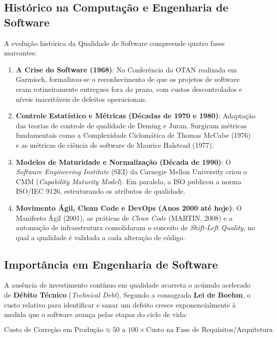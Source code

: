 \documentclass[12pt,a4paper]{article}
\begin{document}
\subsection{Histórico na Computação e Engenharia de Software}
A evolução histórica da Qualidade de Software compreende quatro fases marcantes:
\begin{enumerate}
    \item \textbf{A Crise do Software (1968)}: Na Conferência da OTAN realizada em Garmisch, formalizou-se o reconhecimento de que os projetos de software eram rotineiramente entregues fora do prazo, com custos descontrolados e níveis inaceitáveis de defeitos operacionais.
    \item \textbf{Controle Estatístico e Métricas (Décadas de 1970 e 1980)}: Adaptação das teorias de controle de qualidade de Deming e Juran. Surgiram métricas fundamentais como a Complexidade Ciclomática de Thomas McCabe (1976) e as métricas de ciência de software de Maurice Halstead (1977).
    \item \textbf{Modelos de Maturidade e Normalização (Década de 1990)}: O \textit{Software Engineering Institute} (SEI) da Carnegie Mellon University criou o CMM (\textit{Capability Maturity Model}). Em paralelo, a ISO publicou a norma ISO/IEC 9126, estruturando os atributos de qualidade.
    \item \textbf{Movimento Ágil, Clean Code e DevOps (Anos 2000 até hoje)}: O Manifesto Ágil (2001), as práticas de \textit{Clean Code} (MARTIN, 2008) e a automação de infraestrutura consolidaram o conceito de \textit{Shift-Left Quality}, no qual a qualidade é validada a cada alteração de código.
\end{enumerate}

\subsection{Importância em Engenharia de Software}
A ausência de investimento contínuo em qualidade acarreta o acúmulo acelerado de \textbf{Débito Técnico} (\textit{Technical Debt}). Segundo a consagrada \textbf{Lei de Boehm}, o custo relativo para identificar e sanar um defeito cresce exponencialmente à medida que o software avança pelas etapas do ciclo de vida:

\begin{displaymath}
\text{Custo de Correção em Produção} \approx 50 \text{ a } 100 \times \text{Custo na Fase de Requisitos/Arquitetura}
\end{displaymath}
\end{document}
